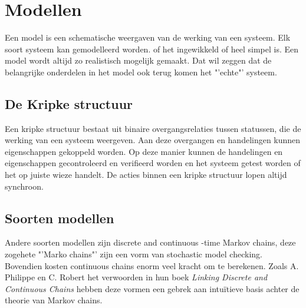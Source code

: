 \documentclass{article}%
\begin{document}
\section{Modellen}
Een model is een schematische weergaven van de werking van een systeem. Elk soort systeem kan gemodelleerd worden. of het ingewikkeld of heel simpel is. Een model wordt altijd zo realistisch mogelijk gemaakt. Dat wil zeggen dat de belangrijke onderdelen in het model ook terug komen het "'echte"' systeem.

\subsection{De Kripke structuur}
Een kripke structuur bestaat uit binaire overgangsrelaties tussen statussen, die de werking van een systeem weergeven.\cite{kripkestructure} Aan deze overgangen en handelingen kunnen eigenschappen gekoppeld worden. Op deze manier kunnen de handelingen en eigenschappen gecontroleerd en verifieerd worden en het systeem getest worden of het op juiste wieze handelt. De acties binnen een kripke structuur lopen altijd synchroon.


\subsection{Soorten modellen} %
Andere soorten modellen zijn discrete and continuous -time Markov chains, deze zogehete "'Marko chains"' zijn een vorm van stochastic model checking. Bovendien kosten continuous chains enorm veel kracht om te berekenen. Zoals A. Philippe en C. Robert het verwoorden in hun boek \textit{Linking Discrete and Continuous Chains}\cite{linkingchains} hebben deze vormen een gebrek aan intuïtieve basis achter de theorie van Markov chains.
\end{document}
